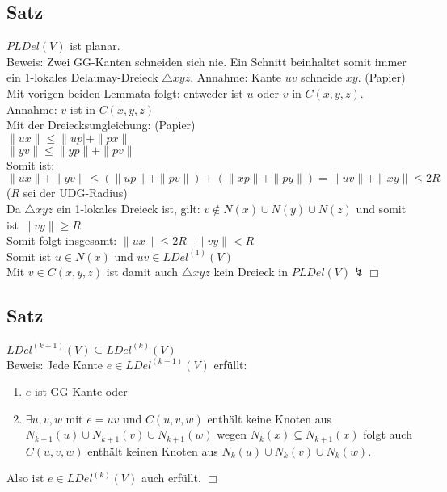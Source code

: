 \documentclass{article}
\begin{document}
\subsection*{Satz}
$PLDel(V)$ ist planar. \\
Beweis: Zwei GG-Kanten schneiden sich nie. Ein Schnitt beinhaltet somit
immer ein 1-lokales Delaunay-Dreieck $\triangle xyz$. Annahme: Kante
$uv$ schneide $xy$. (Papier) Mit vorigen beiden Lemmata folgt: entweder
ist $u$ oder $v$ in $C(x,y,z)$. Annahme: $v$ ist in $C(x,y,z)$ \\
Mit der Dreiecksungleichung: (Papier) \\
$\|ux\| \leq \|up|+\|px\|$ \\
$\|yv\| \leq \|yp\|+\|pv\|$ \\
Somit ist: $\|ux\| + \|yv\| \leq (\|up\| + \|pv\|) + (\|xp\|+\|py\|) =
\|uv\|+\|xy\| \leq 2R$ ($R$ sei der UDG-Radius) \\
Da $\triangle xyz$ ein 1-lokales Dreieck ist, gilt: $v \notin N(x) \cup
N(y) \cup N(z)$ und somit ist $\|vy\| \geq R$ \\
Somit folgt insgesamt: $\|ux\| \leq 2R-\|vy\| < R$ \\
Somit ist $u \in N(x)$ und $uv \in LDel^{(1)}(V)$ \\
Mit $v \in C(x,y,z)$ ist damit auch $\triangle xyz$ kein Dreieck in
$PLDel(V) \lightning \Box$ \\

\subsection*{Satz}
$LDel^{(k+1)}(V) \subseteq LDel^{(k)}(V)$ \\
Beweis: Jede Kante $e \in LDel^{(k+1)}(V)$ erfüllt: \begin{enumerate}
	\item $e$ ist GG-Kante oder
	\item $\exists u,v,w$ mit $e=uv$ und $C(u,v,w)$ enthält keine Knoten aus
	$N_{k+1}(u) \cup N_{k+1}(v) \cup N_{k+1}(w)$ wegen $N_k(x) \subseteq
	N_{k+1}(x)$ folgt auch $C(u,v,w)$ enthält keinen Knoten aus $N_k(u) \cup
	N_k(v) \cup N_k(w)$.
\end{enumerate}
Also ist $e \in LDel^{(k)}(V)$ auch erfüllt. $\Box$ \\
\end{document}
